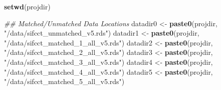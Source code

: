 \documentclass[
]{article}
\newenvironment{Shaded}{\begin{snugshade}}{\end{snugshade}}
\newcommand{\CommentTok}[1]{\textcolor[rgb]{0.56,0.35,0.01}{\textit{#1}}}
\newcommand{\KeywordTok}[1]{\textcolor[rgb]{0.13,0.29,0.53}{\textbf{#1}}}
\newcommand{\NormalTok}[1]{#1}
\newcommand{\StringTok}[1]{\textcolor[rgb]{0.31,0.60,0.02}{#1}}
\begin{document}
\begin{Shaded}
\begin{Highlighting}[]
\KeywordTok{setwd}\NormalTok{(projdir)}

\CommentTok{## Matched/Unmatched Data Locations}
\NormalTok{datadir0 <-}\StringTok{ }\KeywordTok{paste0}\NormalTok{(projdir, }\StringTok{"/data/sifcct_unmatched_v5.rds"}\NormalTok{)}
\NormalTok{datadir1 <-}\StringTok{ }\KeywordTok{paste0}\NormalTok{(projdir, }\StringTok{"/data/sifcct_matched_1_all_v5.rds"}\NormalTok{)}
\NormalTok{datadir2 <-}\StringTok{ }\KeywordTok{paste0}\NormalTok{(projdir, }\StringTok{"/data/sifcct_matched_2_all_v5.rds"}\NormalTok{)}
\NormalTok{datadir3 <-}\StringTok{ }\KeywordTok{paste0}\NormalTok{(projdir, }\StringTok{"/data/sifcct_matched_3_all_v5.rds"}\NormalTok{)}
\NormalTok{datadir4 <-}\StringTok{ }\KeywordTok{paste0}\NormalTok{(projdir, }\StringTok{"/data/sifcct_matched_4_all_v5.rds"}\NormalTok{)}
\NormalTok{datadir5 <-}\StringTok{ }\KeywordTok{paste0}\NormalTok{(projdir, }\StringTok{"/data/sifcct_matched_5_all_v5.rds"}\NormalTok{)}
\end{Highlighting}
\end{Shaded}
\end{document}
